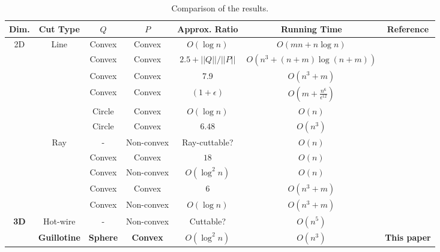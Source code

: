 \documentclass{llncs}
\begin{document}
\begin{table*}[htbp]
\begin{center}
{\scriptsize
\begin{tabular}{|c|c|c|c|c|c|c|}
\hline
Dim. & Cut Type & $Q$ & $P$ & Approx. Ratio & Running Time & Reference \\
\hline
\multirow{11}{*}{2D} 
& \multirow{5}{*}{Line} & Convex & Convex & $O(\log n)$ & $O(mn+n\log n)$  & \cite{ae,ad} \\
\cline{3-7}
& & Convex & Convex & $2.5+||Q||/||P||$ & $O(n^{3}+(n+m)\log{(n+m)})$ & \cite{af} \\
\cline{3-7}
& & Convex & Convex & 7.9 & $O(n^{3}+m)$ & \cite{ac} \\
\cline{3-7}
& & Convex & Convex & $(1+\epsilon)$ & $O(m+\frac{n^{6}}{\epsilon^{12}})$ & \cite{ah} \\
\cline{3-7}
& & Circle & Convex & $O(\log n)$ & $O(n)$ & \cite{AIH} \\
\cline{3-7}
& & Circle & Convex & $6.48$ & $O(n^3)$ & \cite{AIH} \\
\cline{2-7}
& \multirow{5}{*}{Ray} & - & Non-convex & Ray-cuttable? & $O(n)$ & \cite{ag} \\
\cline{3-7}
& & Convex & Convex & $18$ & $O(n)$ & \cite{af} \\
\cline{3-7}
& & Convex & Non-convex & $O(\log^2n)$ & $O(n)$ & \cite{af} \\
\cline{3-7}
& & Convex & Convex & $6$ & $O(n^3+m)$ & \cite{ac} \\
\cline{3-7}
& & Convex & Non-convex & $O(\log n)$ & $O(n^3+m)$ & \cite{ac} \\
\hline
\multirow{2}{*}{{\bf 3D}} & Hot-wire & - & Non-convex & Cuttable? & $O(n^5)$ & \cite{JK03}\\
\cline{2-7}
& {\bf Guillotine} & {\bf Sphere} & {\bf Convex} & {\boldmath$O(\log^2 n)$} & {\boldmath$O(n^3)$} & {\bf This paper} \\
\hline
\end{tabular}
}\end{center}
\caption{Comparison of the results.}
\label{fi:comparison}
\end{table*}
\end{document}
